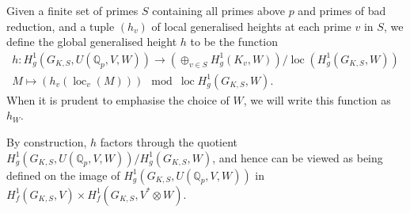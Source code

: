 \documentclass[11pt]{amsart}
\def\Q{\mathbb Q}
\theoremstyle{plain}
\theoremstyle{definition}
\DeclareMathOperator{\loc}{loc}
\begin{document}
Given a finite set of primes $S$ containing all primes above $p$ and primes of bad reduction, and a tuple $(h_v )$ of local generalised heights at each prime $v$ in $S$, we define the global generalised height $h$ to be the function
\begin{align*}
h: H^1 _g (G_{K,S},U(\Q _p ,V,W))\to (\oplus _{v\in S}H^1 _g (K_v ,W))/\loc (H^1 _g (G_{K,S},W)) \\
M\mapsto (h_v (\loc _v (M))) \mod \loc H^1 _g (G_{K,S},W).
\end{align*}
When it is prudent to emphasise the choice of $W$, we will write this function as $h_W$.

By construction, $h$ factors through the quotient $H^1 _g (G_{K,S},U(\Q _p ,V,W))/H^1 _g (G_{K,S},W)$, and hence can be viewed as being defined on the image of $H^1 _g (G_{K,S},U(\Q _p ,V,W))$ in $H^1 _f (G_{K,S},V)\times H^1 _f (G_{K,S},V^* \otimes W)$.
\end{document}
